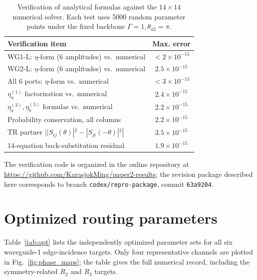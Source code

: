 \documentclass[aps,pra,reprint,superscriptaddress,nofootinbib,longbibliography,floatfix]{revtex4-2}
\begin{document}
\begin{table}[!htbp]
\caption{Verification of analytical formulas against the $14\times14$ numerical solver. Each test uses 5000 random parameter points under the fixed backbone $\Gamma=1,\theta_{a2}=\pi$.}
\label{tab:verification}
\centering
\begin{ruledtabular}
\begin{tabular}{lc}
Verification item & Max. error \\
\hline
WG1-L: $\eta$-form (6 amplitudes) vs.~numerical & $<2\times10^{-15}$ \\
WG2-L: $\eta$-form (6 amplitudes) vs.~numerical & $2.5\times10^{-15}$ \\
All 6 ports: $\eta$-form vs.~numerical & $<3\times10^{-15}$ \\
$\eta_a^{(1)}$ factorization vs.~numerical & $2.4\times10^{-15}$ \\
$\eta_a^{(3)},\eta_b^{(3)}$ formulas vs.~numerical & $2.2\times10^{-15}$ \\
Probability conservation, all columns & $2.2\times10^{-15}$ \\
TR partner $||S_{ij}(\theta)|^2-|S_{ji}(-\theta)|^2|$ & $3.5\times10^{-15}$ \\
14-equation back-substitution residual & $1.9\times10^{-15}$ \\
\end{tabular}
\end{ruledtabular}
\end{table}

The verification code is organized in the online repository at \url{https://github.com/KarasjokMing/paper2-results}; the revision package described here corresponds to branch \texttt{codex/repro-package}, commit \texttt{63a9204}.

\section{Optimized routing parameters}
\label{app:opt}

Table~\ref{tab:opt} lists the independently optimized parameter sets for all six waveguide-1 edge-incidence targets.
Only four representative channels are plotted in Fig.~\ref{fig:phase_maps}; the table gives the full numerical record, including the symmetry-related $R_2$ and $R_3$ targets.
\end{document}
